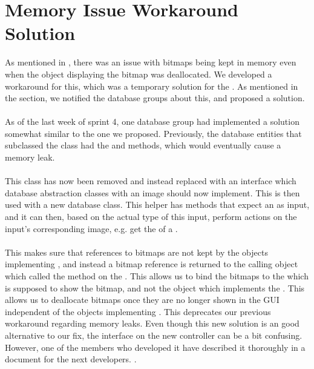 
\section{Memory Issue Workaround Solution}
\label{sec:memory_issue_workaround_solution}

As mentioned in , there was an issue with bitmaps being kept in memory even when the object displaying the bitmap was deallocated. We developed a workaround for this, which was a temporary solution for the . As mentioned in the section, we notified the database groups about this, and proposed a solution.
\\\\
As of the last week of sprint 4, one database group had implemented a solution somewhat similar to the one we proposed. Previously, the database entities that subclassed the  class had the  and  methods, which would eventually cause a memory leak.
\\\\
This class has now been removed and instead replaced with an  interface which database abstraction classes with an image should now implement. This  is then used with a new  database class. This helper has methods that expect an  as input, and it can then, based on the actual type of this input, perform actions on the input's corresponding image, e.g. get the  of a .
\\\\
This makes sure that references to bitmaps are not kept by the objects implementing , and instead a bitmap reference is returned to the calling object which called the  method on the . This allows us to bind the bitmaps to the  which is supposed to show the bitmap, and not the object which implements the . This allows us to deallocate bitmaps once they are no longer shown in the GUI independent of the objects implementing .  This deprecates our previous workaround regarding memory leaks. Even though this new solution is an good alternative to our fix, the interface on the new controller can be a bit confusing. However, one of the members who developed it have described it thoroughly in a document for the next developers. . 